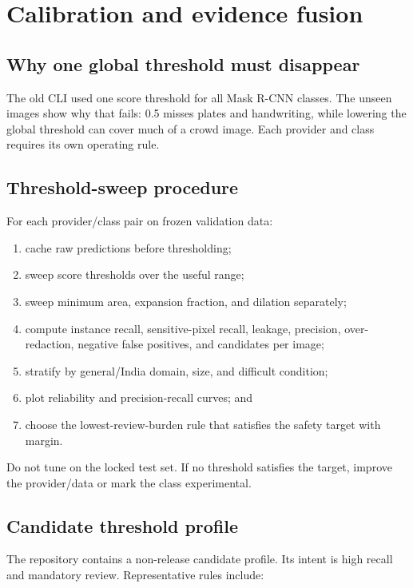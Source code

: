 \chapter{Calibration and evidence fusion}

\section{Why one global threshold must disappear}

The old CLI used one score threshold for all Mask R-CNN classes. The unseen images show why that fails: 0.5 misses plates and handwriting, while lowering the global threshold can cover much of a crowd image. Each provider and class requires its own operating rule.

\section{Threshold-sweep procedure}

For each provider/class pair on frozen validation data:

\begin{enumerate}[leftmargin=7mm]
  \item cache raw predictions before thresholding;
  \item sweep score thresholds over the useful range;
  \item sweep minimum area, expansion fraction, and dilation separately;
  \item compute instance recall, sensitive-pixel recall, leakage, precision, over-redaction, negative false positives, and candidates per image;
  \item stratify by general/India domain, size, and difficult condition;
  \item plot reliability and precision-recall curves; and
  \item choose the lowest-review-burden rule that satisfies the safety target with margin.
\end{enumerate}

Do not tune on the locked test set. If no threshold satisfies the target, improve the provider/data or mark the class experimental.

\section{Candidate threshold profile}

The repository contains a non-release candidate profile. Its intent is high recall and mandatory review. Representative rules include:

